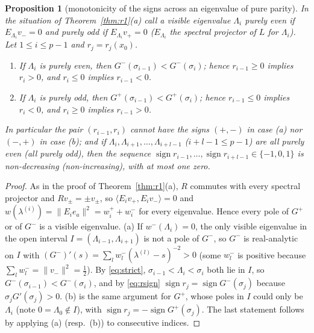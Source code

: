 \documentclass[11pt,a4paper]{article}
\newcommand{\ip}[2]{\langle #1,#2\rangle}
\theoremstyle{plain}
\newtheorem{proposition}[theorem]{Proposition}
\theoremstyle{definition}
\numberwithin{equation}{section}
\begin{document}
\begin{proposition}[monotonicity of the signs across an eigenvalue of pure parity]\label{prop:pure}
In the situation of Theorem~\ref{thm:r1}(a) call a visible eigenvalue $\Lambda_i$ \emph{purely even} if $E_{\Lambda_i}v_-=0$ and \emph{purely odd} if $E_{\Lambda_i}v_+=0$ ($E_{\Lambda_i}$ the spectral projector of $L$ for $\Lambda_i$). Let $1\le i\le p-1$ and $r_j=r_j(x_0)$.
\begin{enumerate}
\item[(a)] If $\Lambda_i$ is purely even, then $G^-(\sigma_{i-1})<G^-(\sigma_i)$; hence $r_{i-1}\ge0$ implies $r_i>0$, and $r_i\le0$ implies $r_{i-1}<0$.
\item[(b)] If $\Lambda_i$ is purely odd, then $G^+(\sigma_{i-1})<G^+(\sigma_i)$; hence $r_{i-1}\le0$ implies $r_i<0$, and $r_i\ge0$ implies $r_{i-1}>0$.
\end{enumerate}
In particular the pair $(r_{i-1},r_i)$ cannot have the signs $(+,-)$ in case (a) nor $(-,+)$ in case (b); and if $\Lambda_i,\Lambda_{i+1},\dots,\Lambda_{i+l-1}$ ($i+l-1\le p-1$) are all purely even (all purely odd), then the sequence $\operatorname{sign}r_{i-1},\dots,\operatorname{sign}r_{i+l-1}\in\{-1,0,1\}$ is non-decreasing (non-increasing), with at most one zero.
\end{proposition}
\begin{proof}
As in the proof of Theorem~\ref{thm:r1}(a), $R$ commutes with every spectral projector and $Rv_\pm=\pm v_\pm$, so $\ip{E_iv_+}{E_iv_-}=0$ and $w(\lambda^{(i)})=\|E_ie_a\|^2=w_i^++w_i^-$ for every eigenvalue. Hence every pole of $G^+$ or of $G^-$ is a visible eigenvalue. (a) If $w^-(\Lambda_i)=0$, the only visible eigenvalue in the open interval $I=(\Lambda_{i-1},\Lambda_{i+1})$ is not a pole of $G^-$, so $G^-$ is real-analytic on $I$ with $(G^-)'(s)=\sum_lw_l^-(\lambda^{(l)}-s)^{-2}>0$ (some $w_l^-$ is positive because $\sum_lw_l^-=\|v_-\|^2=\frac12$). By \eqref{eq:strict}, $\sigma_{i-1}<\Lambda_i<\sigma_i$ both lie in $I$, so $G^-(\sigma_{i-1})<G^-(\sigma_i)$, and by \eqref{eq:rsign} $\operatorname{sign}r_j=\operatorname{sign}G^-(\sigma_j)$ because $\sigma_jG'(\sigma_j)>0$. (b) is the same argument for $G^+$, whose poles in $I$ could only be $\Lambda_i$ (note $0=\Lambda_0\notin I$), with $\operatorname{sign}r_j=-\operatorname{sign}G^+(\sigma_j)$. The last statement follows by applying (a) (resp.\ (b)) to consecutive indices.
\end{proof}
\end{document}
